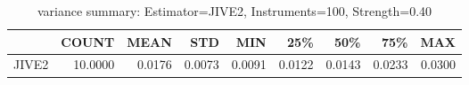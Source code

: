 \begin{table}[ht]
\centering
\caption{variance summary: Estimator=JIVE2, Instruments=100, Strength=0.40}
\begin{tabular}{lrrrrrrrr}
\toprule
 & COUNT & MEAN & STD & MIN & 25\% & 50\% & 75\% & MAX \\
\midrule
JIVE2 & 10.0000 & 0.0176 & 0.0073 & 0.0091 & 0.0122 & 0.0143 & 0.0233 & 0.0300 \\
\bottomrule
\end{tabular}
\end{table}
